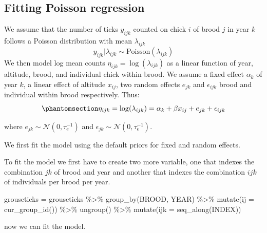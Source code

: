 \documentclass[
  letterpaper,
  DIV=11,
  numbers=noendperiod]{scrartcl}
\newenvironment{Shaded}{\begin{snugshade}}{\end{snugshade}}
\newcommand{\AttributeTok}[1]{\textcolor[rgb]{0.40,0.45,0.13}{#1}}
\newcommand{\FunctionTok}[1]{\textcolor[rgb]{0.28,0.35,0.67}{#1}}
\newcommand{\NormalTok}[1]{\textcolor[rgb]{0.00,0.23,0.31}{#1}}
\newcommand{\OtherTok}[1]{\textcolor[rgb]{0.00,0.23,0.31}{#1}}
\newcommand{\SpecialCharTok}[1]{\textcolor[rgb]{0.37,0.37,0.37}{#1}}
\begin{document}
\subsection{Fitting Poisson
regression}\label{fitting-poisson-regression}

We assume that the number of ticks \(y_{ijk}\) counted on chick \(i\) of
brood \(j\) in year \(k\) follows a Poisson distribution with mean
\(\lambda_{ijk}\) \[
y_{ijk}|\lambda_{ijk}\sim\text{Poisson}(\lambda_{ijk})
\] We then model log mean counts \(\eta_{ijk} = \log(\lambda_{ijk})\) as
a linear function of year, altitude, brood, and individual chick within
brood. We assume a fixed effect \(\alpha_k\) of year \(k\), a linear
effect of altitude \(x_{ij}\), two random effects \(e_{jk}\) and
\(\epsilon_{ijk}\) brood and individual within brood respectively. Thus:
\begin{equation}\phantomsection\label{eq-linpred}{
\eta_{ijk} = \log(\lambda_{ijk}) = \alpha_k + \beta x_{ij} + e_{jk} + \epsilon_{ijk}
}\end{equation}

where \(e_{jk}\sim\mathcal{N}(0,\tau^{-1}_e)\) and
\(\epsilon_{jk}\sim\mathcal{N}(0,\tau^{-1}_\epsilon)\).

We first fit the model using the default priors for fixed and random
effects.

To fit the model we first have to create two more variable, one that
indexes the combination \(jk\) of brood and year and another that
indexes the combination \(ijk\) of individuals per brood per year.

\begin{Shaded}
\begin{Highlighting}[]
\NormalTok{grouseticks  }\OtherTok{=}\NormalTok{ grouseticks }\SpecialCharTok{\%\textgreater{}\%}
  \FunctionTok{group\_by}\NormalTok{(BROOD, YEAR) }\SpecialCharTok{\%\textgreater{}\%}
  \FunctionTok{mutate}\NormalTok{(}\AttributeTok{ij =} \FunctionTok{cur\_group\_id}\NormalTok{()) }\SpecialCharTok{\%\textgreater{}\%}
  \FunctionTok{ungroup}\NormalTok{() }\SpecialCharTok{\%\textgreater{}\%}
  \FunctionTok{mutate}\NormalTok{(}\AttributeTok{ijk =} \FunctionTok{seq\_along}\NormalTok{(INDEX))}
\end{Highlighting}
\end{Shaded}

now we can fit the model.
\end{document}
